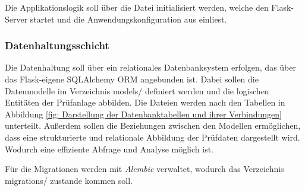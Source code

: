 Die Applikationslogik soll über die Datei  initialisiert werden, welche den Flask-Server startet und die Anwendungskonfiguration aus  einliest.


\subsubsection{Datenhaltungsschicht}

Die Datenhaltung soll über ein relationales Datenbanksystem erfolgen, das über das Flask-eigene SQLAlchemy \ac{ORM} angebunden ist.
Dabei sollen die Datenmodelle im Verzeichnis models/ definiert werden und die logischen Entitäten der Prüfanlage abbilden.
Die Dateien werden nach den Tabellen in Abbildung \ref{fig: Darstellung der Datenbanktabellen und ihrer Verbindungen} unterteilt.
Außerdem sollen die Beziehungen zwischen den Modellen ermöglichen, dass eine strukturierte und relationale Abbildung der Prüfdaten dargestellt wird.
Wodurch eine effiziente Abfrage und Analyse möglich ist.

Für die Migrationen werden mit \textit{Alembic} verwaltet, wodurch das Verzeichnis migrations/ zustande kommen soll.














